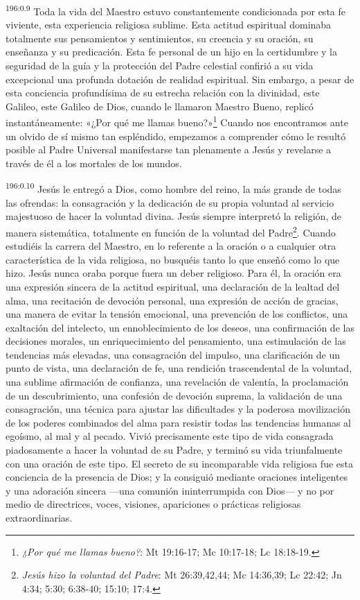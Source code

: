 \par 
\textsuperscript{196:0.9} Toda la vida del Maestro estuvo constantemente condicionada por esta fe viviente, esta experiencia religiosa sublime. Esta actitud espiritual dominaba totalmente sus pensamientos y sentimientos, su creencia y su oración, su enseñanza y su predicación. Esta fe personal de un hijo en la certidumbre y la seguridad de la guía y la protección del Padre celestial confirió a su vida excepcional una profunda dotación de realidad espiritual. Sin embargo, a pesar de esta conciencia profundísima de su estrecha relación con la divinidad, este Galileo, este Galileo de Dios, cuando le llamaron Maestro Bueno, replicó instantáneamente: «¿Por qué me llamas bueno?»\footnote{\textit{¿Por qué me llamas bueno?}: Mt 19:16-17; Mc 10:17-18; Lc 18:18-19.} Cuando nos encontramos ante un olvido de sí mismo tan espléndido, empezamos a comprender cómo le resultó posible al Padre Universal manifestarse tan plenamente a Jesús y revelarse a través de él a los mortales de los mundos.

\par 
\textsuperscript{196:0.10} Jesús le entregó a Dios, como hombre del reino, la más grande de todas las ofrendas: la consagración y la dedicación de su propia voluntad al servicio majestuoso de hacer la voluntad divina. Jesús siempre interpretó la religión, de manera sistemática, totalmente en función de la voluntad del Padre\footnote{\textit{Jesús hizo la voluntad del Padre}: Mt 26:39,42,44; Mc 14:36,39; Lc 22:42; Jn 4:34; 5:30; 6:38-40; 15:10; 17:4.}. Cuando estudiéis la carrera del Maestro, en lo referente a la oración o a cualquier otra característica de la vida religiosa, no busquéis tanto lo que enseñó como lo que hizo. Jesús nunca oraba porque fuera un deber religioso. Para él, la oración era una expresión sincera de la actitud espiritual, una declaración de la lealtad del alma, una recitación de devoción personal, una expresión de acción de gracias, una manera de evitar la tensión emocional, una prevención de los conflictos, una exaltación del intelecto, un ennoblecimiento de los deseos, una confirmación de las decisiones morales, un enriquecimiento del pensamiento, una estimulación de las tendencias más elevadas, una consagración del impulso, una clarificación de un punto de vista, una declaración de fe, una rendición trascendental de la voluntad, una sublime afirmación de confianza, una revelación de valentía, la proclamación de un descubrimiento, una confesión de devoción suprema, la validación de una consagración, una técnica para ajustar las dificultades y la poderosa movilización de los poderes combinados del alma para resistir todas las tendencias humanas al egoísmo, al mal y al pecado. Vivió precisamente este tipo de vida consagrada piadosamente a hacer la voluntad de su Padre, y terminó su vida triunfalmente con una oración de este tipo. El secreto de su incomparable vida religiosa fue esta conciencia de la presencia de Dios; y la consiguió mediante oraciones inteligentes y una adoración sincera ---una comunión ininterrumpida con Dios--- y no por medio de directrices, voces, visiones, apariciones o prácticas religiosas extraordinarias.

